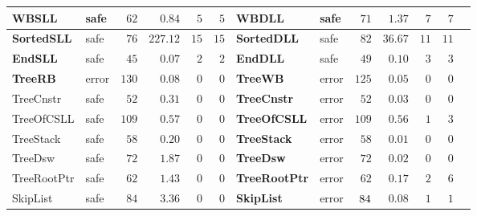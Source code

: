 \documentclass{beamer}
\newcommand{\safe}[0]{safe}
\newcommand{\unsafe}[0]{error}
\begin{document}
\begin{frame}
\begin{center}
\begin{adjustbox}{max height=\textheight, max width=\textwidth}
\begin{tabular}{| l | l | r | r | r | r || l | l | r | r | r | r | r |}
        \hline
		\rowcolor{rowgray}
		\textbf{WBSLL}       & \safe & $62$ & $0.84$   &  $5$  & $5$ & \textbf{WBDLL} & \safe & $71$ &  $1.37$  & $7$ & $7$ \\
        \hline
		\rowcolor{rowgray}
		\textbf{SortedSLL}   & \safe & $76$ & $227.12$ &  $15$ & $15$ & \textbf{SortedDLL} & \safe & $82$ &  $36.67$ & $11$ & $11$ \\
        \hline
		\rowcolor{rowgray}
		\textbf{EndSLL}      & \safe  & $45$ & $0.07$   &  $2$  & $2$ & \textbf{EndDLL} & \safe & $49$ &  $0.10$  & $3$ & $3$ \\
        \hline
		\rowcolor{rowgray}
		\textbf{TreeRB} & \unsafe & $130$ &  $0.08$  & $0$  & $0$ & \textbf{TreeWB} & \unsafe & $125$ &  $0.05$  & $0$ & $0$ \\
        \hline
		TreeCnstr & \safe & $52$ & $0.31$  & $0$  & $0$ & \cellcolor{rowgray}\textbf{TreeCnstr} & \cellcolor{rowgray}\unsafe & \cellcolor{rowgray} $52$ & \cellcolor{rowgray} $0.03$  & \cellcolor{rowgray} $0$ & \cellcolor{rowgray} $0$ \\
        \hline
		TreeOfCSLL & \safe & $109$ &  $0.57$  & $0$  & $0$ & \cellcolor{rowgray}\textbf{TreeOfCSLL}  & \cellcolor{rowgray}\unsafe & \cellcolor{rowgray} $109$ & \cellcolor{rowgray} $0.56$  & \cellcolor{rowgray} $1$ & \cellcolor{rowgray} $3$ \\
        \hline
		TreeStack & \safe & $58$ &  $0.20$  & $0$  & $0$ & \cellcolor{rowgray}\textbf{TreeStack} & \cellcolor{rowgray}\unsafe & \cellcolor{rowgray} $58$ & \cellcolor{rowgray} $0.01$  & \cellcolor{rowgray} $0$ & \cellcolor{rowgray} $0$ \\
        \hline
		TreeDsw   & \safe & $72$ & $1.87$  & $0$  & $0$ & \cellcolor{rowgray}\textbf{TreeDsw} & \cellcolor{rowgray}\unsafe & \cellcolor{rowgray} $72$ & \cellcolor{rowgray} $0.02$  & \cellcolor{rowgray} $0$ &  \cellcolor{rowgray} $0$ \\
		\hline
		TreeRootPtr & \safe & $62$ &  $1.43$  & $0$  &  $0$ & \cellcolor{rowgray}\textbf{TreeRootPtr} & \cellcolor{rowgray}\unsafe & \cellcolor{rowgray} $62$ & \cellcolor{rowgray} $0.17$  & \cellcolor{rowgray} $2$ & \cellcolor{rowgray} $6$\\
        \hline
		SkipList    & \safe & $84$ & $3.36$  & $0$  & $0$ & \cellcolor{rowgray}\textbf{SkipList} & \cellcolor{rowgray}\unsafe & $\cellcolor{rowgray} 84$ & \cellcolor{rowgray} $0.08$  & \cellcolor{rowgray} $1$  & \cellcolor{rowgray} $1$ \\
        \hline
	\end{tabular}
	\label{tab:times}
	\end{adjustbox}	
	\end{center}

\end{frame}
\end{document}
